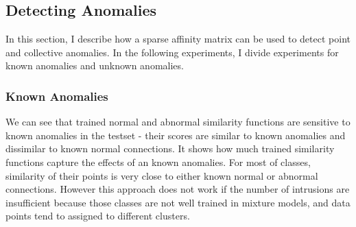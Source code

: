 \subsection{Detecting Anomalies}
\label{subsec:detectinganomalies}
In this section, I describe how a sparse affinity matrix can be used to detect point and collective anomalies. 
In the following experiments, I divide experiments for known anomalies and unknown anomalies. 

\subsubsection{Known Anomalies}
We can see that trained normal and abnormal similarity functions are sensitive to known anomalies in the testset - their scores are similar to known anomalies and dissimilar to known normal connections. 
It shows how much trained similarity functions capture the effects of an known anomalies. 
For most of classes, similarity of their points is very close to either known normal or abnormal connections. 
However this approach does not work if the number of intrusions are insufficient because those classes are not well trained in mixture models, and data points tend to assigned to different clusters. 

